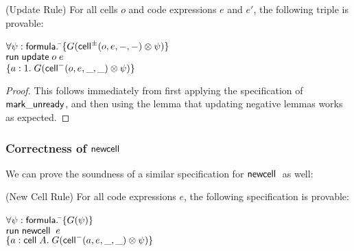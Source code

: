 \begin{lemma}{(Update Rule)}
For all cells $o$ and code expressions $e$ and $e'$, the following
triple is provable: 

\begin{tabbing}
$\forall \psi:\mathsf{formula}.\; $\=$\{{G(\mathsf{cell}^{\pm}({o}, {e}, {-}, {-}) \otimes \psi)}\}$ \\
                           \>$\mathsf{run}\; {\mathsf{update}\;o\;e}$ \\
                           \>$\{{a:1.\; G(\mathsf{cell}^{-}({o}, {e}, {\_}, {\_}) \otimes \psi)}\}$
\end{tabbing}
\end{lemma}

\begin{proof}
This follows immediately from first applying the specification of $\mathsf{mark\_unready}$, 
and then using the lemma that updating negative lemmas works as expected. 
\end{proof}


\subsubsection{Correctness of $\mathsf{newcell}\;$}

We can prove the soundness of a similar specification for $\mathsf{newcell}\;$ as
well:

\begin{prop}{(New Cell Rule)}
For all code expressions $e$, the following specification is provable: 
\begin{tabbing}
$\forall \psi:\mathsf{formula}.\; $\=$\{{G(\psi)}\}$ \\
                           \>$\mathsf{run}\;{\mathsf{newcell}\;\;e}$ \\
                           \>$\{{a:\mathsf{cell}\;{A}.\; G(\mathsf{cell}^{-}({a}, {e}, {\_}, {\_}) \otimes \psi)}\}$
\end{tabbing}
\end{prop}

